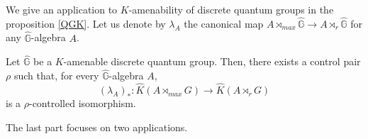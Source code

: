 \begin{itemize}
We give an application to $K$-amenability of discrete quantum groups in the proposition \ref{QGK}. Let us denote by $\lambda_A$ the canonical map $A\rtimes_{max} \hat{\mathbb G} \rightarrow A \rtimes_r \hat{\mathbb G}$ for any $\hat{\mathbb G}$-algebra $A$.\\

\begin{prop}
Let $\hat{\mathbb G}$ be a $K$-amenable discrete quantum group. Then, there exists a control pair $\rho$ such that, for every $\hat{\mathbb G}$-algebra $A$,
\[(\lambda_A)_* : \hat K(A\rtimes_{max} G) \rightarrow \hat K(A\rtimes_r G) \]
is a $\rho$-controlled isomorphism.\\
\end{prop}

\end{itemize}

The last part focuses on two applications. \\

